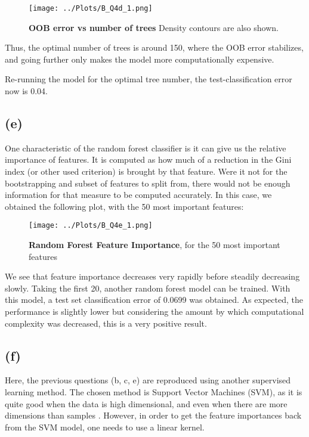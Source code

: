 \documentclass[12pt]{report} %
\begin{document}
\begin{figure}[htbp]
    \centering
    \texttt{[image: ../Plots/B\_Q4d\_1.png]}
    \caption{\textbf{OOB error vs number of trees} Density contours are also shown.}
\end{figure}

Thus, the optimal number of trees is around 150, where the OOB error stabilizes, and going further only makes the model more computationally expensive.

Re-running the model for the optimal tree number, the test-classification error now is 0.04.


\subsection*{(e)}

One characteristic of the random forest classifier is it can give us the relative importance of features. It is computed as how much of a reduction in the Gini index (or other used criterion) is brought by that feature. Were it not for the bootstrapping and subset of features to split from, there would not be enough information for that measure to be computed accurately\cite[pp. 345-346]{james2013introduction}. In this case, we obtained the following plot, with the 50 most important features:

\begin{figure}[htbp]
    \centering
    \texttt{[image: ../Plots/B\_Q4e\_1.png]}
    \caption{\textbf{Random Forest Feature Importance}, for the 50 most important features}
\end{figure}

We see that feature importance decreases very rapidly before steadily decreasing slowly. Taking the first 20, another random forest model can be trained. With this model, a test set classification error of 0.0699 was obtained. As expected, the performance is slightly lower but considering the amount by which computational complexity was decreased, this is a very positive result.


\subsection*{(f)}

Here, the previous questions (b, c, e) are reproduced using another supervised learning method. The chosen method is Support Vector Machines (SVM), as it is quite good when the data is high dimensional, and even when there are more dimensions than samples \cite{svm_sklearn}. However, in order to get the feature importances back from the SVM model, one needs to use a linear kernel. 
\end{document}
